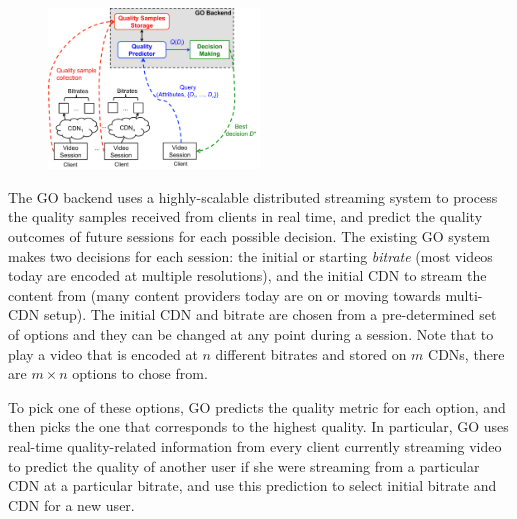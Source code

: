 \begin{figure}[h!]
\centering
 \includegraphics[width=0.5\textwidth] {figures/go-overview.pdf}
\label{fig:go-overview}
\end{figure}
 
The GO backend uses a highly-scalable distributed streaming system to
process the quality samples received from clients in real time, and
predict the quality outcomes of future sessions for each possible
decision.  The existing GO system makes two decisions for each
session: the initial or starting {\it bitrate} (most videos today are
encoded at multiple resolutions), and the initial CDN to stream the
content from (many content providers today are on or moving towards
multi-CDN setup). The initial CDN and bitrate are chosen from a
pre-determined set of options and they can be changed at any point
during a session. Note that to play a video that is encoded at $n$
different bitrates and stored on $m$ CDNs, there are $m\times n$
options to chose from.

To pick one of these options, GO predicts the quality metric for each
option, and then picks the one that corresponds to the highest
quality. In particular, GO uses real-time quality-related information
from every client currently streaming video to predict the quality of
another user if she were streaming from a particular CDN at a
particular bitrate, and use this prediction to select initial bitrate
and CDN for a new user.



